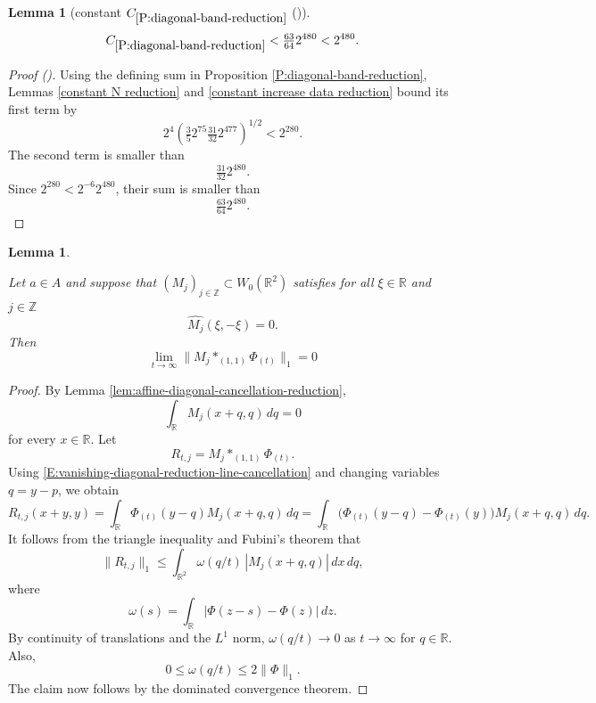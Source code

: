 \documentclass[12pt,reqno]{amsart}
\newcommand{\auto}{{({\tiny\faCar})}}
\theoremstyle{plain}
\newtheorem{lemma}[theorem]{Lemma}
\numberwithin{equation}{section}
\theoremstyle{remark}
\newcommand{\uses}[1]{}
\newcommand{\usesdefs}[1]{}
\newcommand{\Z}{{\mathbb Z}}
\newcommand{\R}{{\mathbb R}}
\begin{document}
\begin{lemma}[constant $C_{\ref{P:diagonal-band-reduction}}$ \auto]\label{constant diagonal band reduction}\uses{constant N reduction,constant increase data reduction,P:diagonal-band-reduction}\usesdefs{}
\begin{equation}\label{constant diagonal band reduction bound}
C_{\ref{P:diagonal-band-reduction}}
<\tfrac{63}{64}2^{480}<2^{480}.
\end{equation}
\end{lemma}
\begin{proof}[Proof \auto]
Using the defining sum in Proposition \ref{P:diagonal-band-reduction}, Lemmas \ref{constant N reduction} and \ref{constant increase data reduction} bound its first term by
\[
2^4\left(\tfrac35 2^{75}\tfrac{31}{32}2^{477}\right)^{1/2}
<2^{280}.
\]
The second term is smaller than
\[
\tfrac{31}{32}2^{480}.
\]
Since $2^{280}<2^{-6}2^{480}$, their sum is smaller than
\[
\tfrac{63}{64}2^{480}.
\]
\end{proof}


\begin{lemma}\label{lem:L1-reduction}\uses{lem:affine-diagonal-cancellation-reduction}\usesdefs{auto:Wiener-space-definition,auto:convolution-along-vector-definition,multiplicatively spaced monotone sequences,standard bump}

Let $a\in A$ and suppose that $(M_j)_{j\in\Z}\subset W_0(\R^2)$ satisfies for all $\xi \in \R$ and $j\in \Z$
\begin{equation}\label{auto:vanishing-diagonal-assumption}
\widehat{M_j}(\xi,-\xi)=0.
\end{equation}
Then
\begin{equation}\label{auto:vanishing-diagonal-large-scale-limit}    \lim_{t\to\infty}
    \| M_j\ast_{(1,1)}\Phi_{(t)} \|_1
    =0
    \end{equation}
\end{lemma}

\begin{proof}


By Lemma \ref{lem:affine-diagonal-cancellation-reduction},
\begin{equation}
    \label{E:vanishing-diagonal-reduction-line-cancellation}
    \int_{\mathbb R}M_j(x+q,q)\,dq=0
\end{equation}
for every \(x\in\mathbb R\).
Let
\[
R_{t,j}=M_j\ast_{(1,1)}\Phi_{(t)}.
\]
Using \eqref{E:vanishing-diagonal-reduction-line-cancellation} and
changing variables \(q=y-p\), we obtain
\[
R_{t,j}(x+y,y) = \int_{\mathbb R} \Phi_{(t)}(y-q)M_j(x+q,q)\,dq = \int_{\mathbb R} \bigl(\Phi_{(t)}(y-q)-\Phi_{(t)}(y)\bigr) M_j(x+q,q)\,dq.
\]
It follows from the triangle inequality and Fubini's theorem that
    \[
    \|R_{t,j}\|_1
    \le
    \int_{\mathbb R^2}
    \omega(q/t)\,
    |M_j(x+q,q)|\,dx\,dq,
    \]
    where
    \[
    \omega(s)
    =
    \int_{\mathbb R}|\Phi(z-s)-\Phi(z)|\,dz.
    \]
    By continuity of translations and the $L^1$ norm,
    \(\omega(q/t)\to0\) as \(t\to\infty\) for   \(q\in\mathbb R\).
    Also,
    \[
    0\le \omega(q/t)\le 2\|\Phi\|_1.
    \]
The claim now follows by the
    dominated convergence theorem.
\end{proof}
\end{document}
